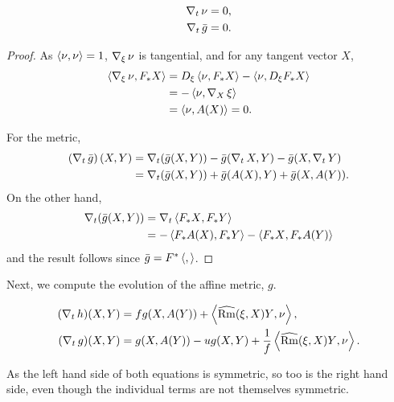 \documentclass{amsart}
\begin{document}
\begin{lemma}
\label{lem:gaussmap}
\begin{align}
\D_t \nor & = 0, \\
\D_t \bar{g} &= 0.
\end{align}
\end{lemma}

\begin{proof}
As $\ip{\nor}{\nor} = 1$, $\D_{\vel} \nor$ is tangential, and for any tangent vector $X$,
\[
\begin{split}
\ip{\D_{\vel} \nor}{F_{\ast} X} &= D_{\vel} \ip{\nor}{F_{\ast}X} - \ip{\nor}{D_{\vel} F_{\ast} X} \\
&= -\ip{\nor}{\D_{X}\vel} \\
&= \ip{\nor}{A(X)} = 0.
\end{split}
\]

For the metric,
\[
\begin{split}
\left(\D_t \bar{g}\right) (X, Y) &= \D_t (\bar{g}(X, Y)) - \bar{g}(\D_t X, Y) - \bar{g}(X, \D_t Y) \\
&= \D_t (\bar{g}(X, Y)) + \bar{g}(A(X), Y) + \bar{g}(X, A(Y)).
\end{split}
\]
On the other hand,
\[
\begin{split}
\D_t (\bar{g}(X, Y)) &= \D_t \ip{F_{\ast} X}{F_{\ast} Y} \\
&= -\ip{F_{\ast} A(X)}{F_{\ast} Y} - \ip{F_{\ast} X}{F_{\ast} A(Y)}
\end{split}
\]
and the result follows since $\bar{g} = F^{\ast} \ip{}{}$.
\end{proof}

Next, we compute the evolution of the affine metric, $g$.

\begin{lemma}
\label{lem:metric}
\begin{align*}
(\D_t h) (X, Y) &= f g(X, A(Y)) + \ip{\widehat{\Rm}(\vel, X) Y}{\nor}, \\
(\D_t g) (X, Y) &= g(X, A(Y)) - u g(X, Y) + \frac{1}{f} \ip{\widehat{\Rm}(\vel, X) Y}{\nor}.
\end{align*}
\end{lemma}

As the left hand side of both equations is symmetric, so too is the right hand side, even though the individual terms are not themselves symmetric.
\end{document}
